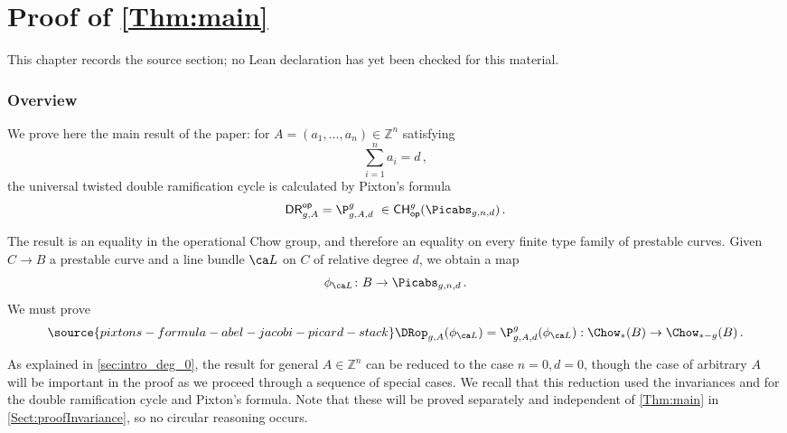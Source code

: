 \chapter{Proof of \texorpdfstring{\cref{Thm:main}}{main theorem}}
\label{pixtons-formula-abel-jacobi-picard-stack-chapter-06}

\begin{remark}
\label{pixtons-formula-abel-jacobi-picard-stack-chapter-06-source}
This chapter records the source section; no Lean declaration has yet been checked for this material.
\notready
\end{remark}

\label{sec:proof_of_main_theorem}
\subsection{Overview} \label{sec:proof_of_main_theorem_overview}
We prove here the main result of the paper:
for $A=(a_1,\ldots,a_n)\in \mathbb{Z}^n$  satisfying $$\sum_{i=1}^n a_i=d\, ,$$
the universal twisted double ramification cycle is calculated by Pixton's formula
$$\mathsf{DR}^{\mathsf{op}}_{g,A} =\P_{g,A,d}^g\
\in {\mathsf{CH}}^g_{\mathsf{op}}(\Picabs_{g,n,d})\, .$$



The result is an equality in the operational Chow group, and therefore
an equality on every finite type family of prestable curves. Given $C\to B$ a prestable curve and a line bundle $\ca L$ on $C$ of relative degree $d$, we obtain
a map $$\phi_{\ca L}\colon B \to \Picabs_{g,n,d}\, .$$
We must prove
\begin{equation}\label{eq:main_conj}
\source{pixtons-formula-abel-jacobi-picard-stack}
\DRop_{g,A}(\phi_{\ca L})= {\P_{g,A,d}^g}(\phi_{\ca L}) : \Chow_*(B) \to \Chow_{*-g}(B)\, .
\end{equation}



As explained in \cref{sec:intro_deg_0},  the result for general $A \in \mathbb{Z}^n$ can be reduced  to the case $n=0, d=0$, though the case of arbitrary $A$ will be important in the proof as we proceed through a sequence of special cases. We recall that this reduction used the invariances \invnrn{} and \invnrA{} for the double ramification cycle and Pixton's formula. Note that these will be proved separately and independent of \cref{Thm:main} in \cref{Sect:proofInvariance}, so no circular reasoning occurs.




